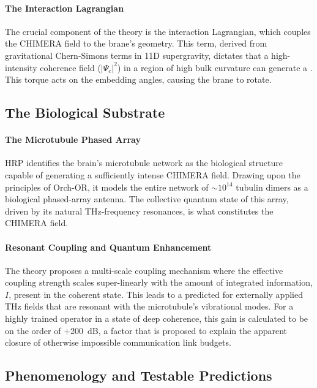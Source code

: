 \paragraph{The Interaction Lagrangian}
The crucial component of the theory is the interaction Lagrangian, which couples the CHIMERA field to the brane's geometry. This term, derived from gravitational Chern-Simons terms in 11D supergravity, dictates that a high-intensity coherence field (\(|\Psi_c|^2\)) in a region of high bulk curvature can generate a . This torque acts on the embedding angles, causing the brane to rotate.

\subsection{The Biological Substrate}

\paragraph{The Microtubule Phased Array}
HRP identifies the brain's microtubule network as the biological structure capable of generating a sufficiently intense CHIMERA field. Drawing upon the principles of Orch-OR, it models the entire network of \(\sim10^{14}\) tubulin dimers as a biological phased-array antenna. The collective quantum state of this array, driven by its natural THz-frequency resonances, is what constitutes the CHIMERA field.

\paragraph{Resonant Coupling and Quantum Enhancement}
The theory proposes a multi-scale coupling mechanism where the effective coupling strength scales super-linearly with the amount of integrated information, \(I\), present in the coherent state. This leads to a predicted  for externally applied THz fields that are resonant with the microtubule's vibrational modes. For a highly trained operator in a state of deep coherence, this gain is calculated to be on the order of +200~dB, a factor that is proposed to explain the apparent closure of otherwise impossible communication link budgets.

\subsection{Phenomenology and Testable Predictions}

